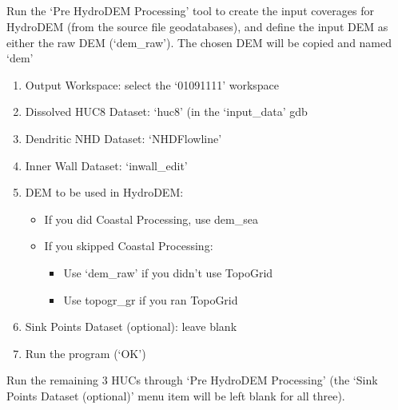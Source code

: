 \documentclass[letterpaper,10pt,english]{sphinxmanual}
\begin{document}
\subparagraph{}
\label{\detokenize{ex_1:c-pre-hydrodem-processing-from-arccat}}
Run the ‘Pre HydroDEM Processing’ tool to create the input coverages for HydroDEM (from the source file geodatabases), and define the input DEM as either the raw DEM (‘dem\_raw’).  The chosen DEM will be copied and named ‘dem’
\begin{enumerate}
\def\theenumi{\arabic{enumi}}
\def\labelenumi{\theenumi .}
\makeatletter\def\p@enumii{\p@enumi \theenumi .}\makeatother
\item {} 
Output Workspace: select the ‘01091111’ workspace

\item {} 
Dissolved HUC8 Dataset: ‘huc8’ (in the ‘input\_data’ gdb

\item {} 
Dendritic NHD Dataset: ‘NHDFlowline’

\item {} 
Inner Wall Dataset: ‘inwall\_edit’

\item {} 
DEM to be used in HydroDEM:
\begin{itemize}
\item {} 
If you did Coastal Processing, use dem\_sea

\item {} 
If you skipped Coastal Processing:
\begin{itemize}
\item {} 
Use ‘dem\_raw’ if you didn’t use TopoGrid

\item {} 
Use topogr\_gr if you ran TopoGrid

\end{itemize}

\end{itemize}

\item {} 
Sink Points Dataset (optional): leave blank

\item {} 
Run the program (‘OK’)

\end{enumerate}

Run the remaining 3 HUCs through ‘Pre HydroDEM Processing’ (the ‘Sink Points Dataset (optional)’ menu item will be left blank for all three).


\end{document}
